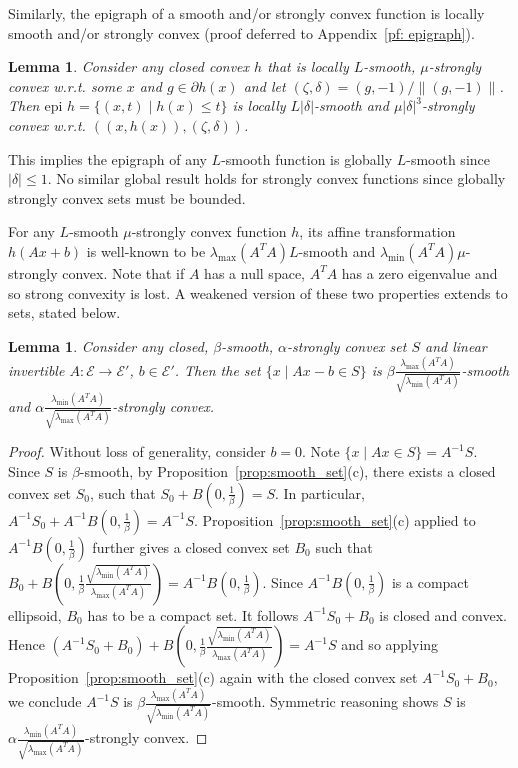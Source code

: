 \documentclass[sn-mathphys,Numbered]{sn-jnl}%
\newcommand{\epi}{\text{epi }}
\newtheorem{lemma}[theorem]{Lemma}%
\begin{document}
 Similarly, the epigraph of a smooth and/or strongly convex function is locally smooth and/or strongly convex (proof deferred to Appendix~\ref{pf: epigraph}). 
\begin{lemma} \label{lemma:epigraph}
    Consider any closed convex $h$ that is locally $L$-smooth, $\mu$-strongly convex w.r.t. some $x$ and $g\in\partial h(x)$ and let $(\zeta,\delta) = (g,-1)/\|(g,-1)\|$. Then $\epi h = \{(x,t)\mid h(x) \leq t\}$ is locally $L|\delta|$-smooth and $\mu|\delta|^3$-strongly convex w.r.t. $((x,h(x)), (\zeta,\delta))$.
\end{lemma}
This implies the epigraph of any $L$-smooth function is globally $L$-smooth since $|\delta|\leq 1$. No similar global result holds for strongly convex functions since globally strongly convex sets must be bounded.

 For any $L$-smooth $\mu$-strongly convex function $h$, its affine transformation $h(Ax+b)$ is well-known to be $\lambda_{ \max}(A^TA)L$-smooth and $\lambda_{\min}(A^TA)\mu$-strongly convex. Note that if $A$ has a null space, $A^TA$ has a zero eigenvalue and so strong convexity is lost. A weakened version of these two properties extends to sets, stated below. 
\begin{lemma} \label{lemma:aff_trans}
    Consider any closed, $\beta$-smooth, $\alpha$-strongly convex set $S$ and linear invertible $A\colon \mathcal{E}\rightarrow \mathcal{E}'$, $b\in\mathcal{E}'$. Then the set $\{x \mid Ax-b\in S\}$ is $\beta\frac{\lambda _{\max}(A^TA)}{\sqrt{\lambda_{\min}(A^TA)}}$-smooth and $\alpha \frac{\lambda _{\min}(A^TA)}{\sqrt{\lambda_{\max}(A^TA)}}$-strongly convex. 
\end{lemma}
\begin{proof}
    Without loss of generality, consider $b=0$. Note $\{x \mid Ax\in S\}=A^{-1}S$. Since $S$ is $\beta$-smooth, by Proposition~\ref{prop:smooth_set}(c), there exists a closed convex set $S_0$, such that $S_0+B(0,\frac{1}{\beta})=S$. In particular, $A^{-1}S_0+A^{-1}B(0,\frac{1}{\beta})=A^{-1}S$. Proposition~\ref{prop:smooth_set}(c) applied to $A^{-1}B(0,\frac{1}{\beta})$ further gives a closed convex set $B_0$ such that $B_0+B\left(0,\frac{1}{\beta}\frac{\sqrt{\lambda_{\min}(A^TA)}}{\lambda_{\max}(A^TA)}\right)=A^{-1}B(0,\frac{1}{\beta})$. Since $A^{-1}B(0,\frac{1}{\beta})$ is a compact ellipsoid, $B_0$ has to be a compact set. It follows $A^{-1}S_0+B_0$ is closed and convex. Hence $\left(A^{-1}S_0+B_0\right)+B\left(0,\frac{1}{\beta}\frac{\sqrt{\lambda_{\min}(A^TA)}}{\lambda_{\max}(A^TA)}\right)=A^{-1}S$ and so applying Proposition~\ref{prop:smooth_set}(c) again with the closed convex set $A^{-1}S_0+B_0$, we conclude $A^{-1}S$ is $\beta\frac{\lambda_{\max}(A^TA)}{\sqrt{\lambda_{\min}(A^TA)}}$-smooth. Symmetric reasoning shows $S$ is $\alpha \frac{\lambda _{\min}(A^TA)}{\sqrt{\lambda_{\max}(A^TA)}}$-strongly convex. 
\end{proof}
\end{document}
